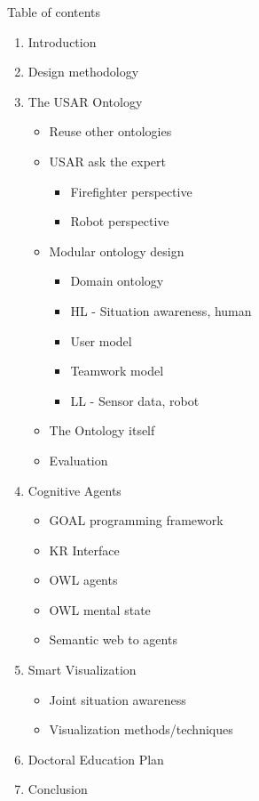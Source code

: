 Table of contents
\tableofcontents{}

\begin{enumerate}
\item Introduction
\item Design methodology
\item The USAR Ontology
\begin{itemize}
\item Reuse other ontologies
\item USAR ask the expert 
\begin{itemize}
\item Firefighter perspective
\item Robot perspective
\end{itemize}
\item Modular ontology design
\begin{itemize}
\item Domain ontology
\item HL - Situation awareness, human 
\item User model
\item Teamwork model
\item LL - Sensor data, robot
\end{itemize}
\item The Ontology itself
\item Evaluation
\end{itemize}

\item Cognitive Agents
\begin{itemize}
\item GOAL programming framework
\item KR Interface
\item OWL agents
\item OWL mental state
\item Semantic web to agents
\end{itemize}

\item Smart Visualization
\begin{itemize}
\item Joint situation awareness
\item Visualization methods/techniques
\end{itemize}
\item Doctoral Education Plan
\item Conclusion
\end{enumerate}
    
    
  
